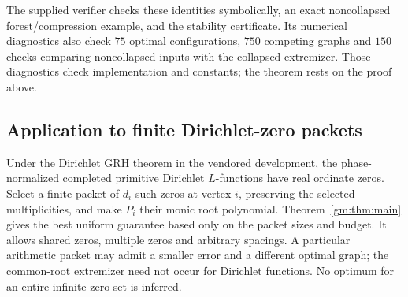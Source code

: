 The supplied verifier checks these identities symbolically, an exact
noncollapsed forest/compression example, and the stability certificate.
Its numerical diagnostics also check $75$ optimal configurations,
$750$ competing graphs and $150$ checks comparing noncollapsed inputs
with the collapsed extremizer. Those diagnostics check implementation and constants;
the theorem rests on the proof above.

\subsection{Application to finite Dirichlet-zero packets}

Under the Dirichlet GRH theorem in the vendored development, the phase-normalized
completed primitive Dirichlet $L$-functions have real ordinate zeros. Select a
finite packet of $d_i$ such zeros at vertex $i$, preserving the selected
multiplicities, and make $P_i$ their monic root polynomial. Theorem~\ref{gm:thm:main}
gives the best uniform guarantee based only on the packet sizes and budget.
It allows shared zeros, multiple zeros and arbitrary spacings.
A particular arithmetic packet may admit a smaller error and a different
optimal graph; the common-root extremizer need not occur for Dirichlet
functions. No optimum for an entire infinite zero set is inferred.
